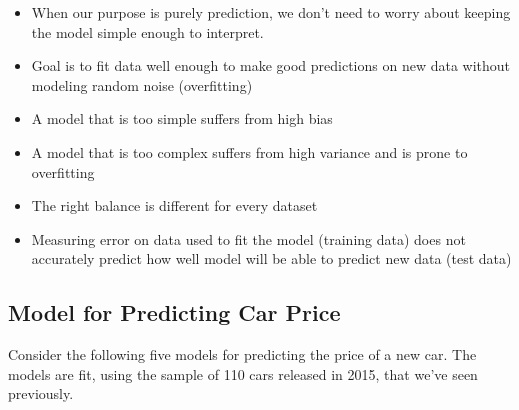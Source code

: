 \documentclass[]{book}
\providecommand{\tightlist}{%
  \setlength{\itemsep}{0pt}\setlength{\parskip}{0pt}}
\begin{document}
\begin{itemize}
\tightlist
\item
  When our purpose is purely prediction, we don't need to worry about
  keeping the model simple enough to interpret.\\
\item
  Goal is to fit data well enough to make good predictions on new data
  without modeling random noise (overfitting)\\
\item
  A model that is too simple suffers from high bias\\
\item
  A model that is too complex suffers from high variance and is prone to
  overfitting\\
\item
  The right balance is different for every dataset\\
\item
  Measuring error on data used to fit the model (training data) does not
  accurately predict how well model will be able to predict new data
  (test data)
\end{itemize}

\subsection{Model for Predicting Car
Price}\label{model-for-predicting-car-price}

Consider the following five models for predicting the price of a new
car. The models are fit, using the sample of 110 cars released in 2015,
that we've seen previously.
\end{document}
